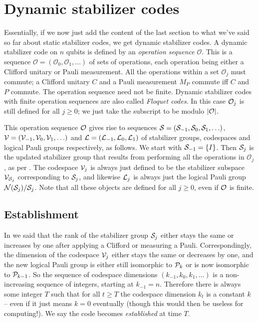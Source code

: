 \section{Dynamic stabilizer codes}\label{sec:dynamic-stabilizer-codes}

Essentially, if we now just add the content of the last section to what we've said so far about static stabilizer codes, we get dynamic stabilizer codes.
A dynamic stabilizer code on $n$ qubits is defined by an \textit{operation sequence} $\mathcal{O}$.
This is a sequence $\mathcal{O} = (\mathcal{O}_0, \mathcal{O}_1, \ldots)$ of sets of operations, each operation being either a Clifford unitary or Pauli measurement.
All the operations within a set $\mathcal{O}_j$ must commute; a Clifford unitary $C$ and a Pauli measurement $M_P$ commute iff $C$ and $P$ commute.
The operation sequence need not be finite.
Dynamic stabilizer codes with finite operation sequences are also called \textit{Floquet codes}.
In this case $\mathcal{O}_j$ is still defined for all $j \geq 0$; we just take the subscript to be modulo $|\mathcal{O}|$.

This operation sequence $\mathcal{O}$ gives rise to sequences $\mathcal{S} = (\mathcal{S}_{-1}, \mathcal{S}_0, \mathcal{S}_1, \ldots)$, $\mathcal{V} = (\mathcal{V}_{-1}, \mathcal{V}_0, \mathcal{V}_1, \ldots)$ and $\mathcal{L} = (\mathcal{L}_{-1}, \mathcal{L}_0, \mathcal{L}_1)$ of stabilizer groups, codespaces and logical Pauli groups respectively, as follows.
We start with $\mathcal{S}_{-1} = \{I\}$.
Then $\mathcal{S}_{j}$ is the updated stabilizer group that results from performing all the operations in $\mathcal{O}_j$, as per .
The codespace $\mathcal{V}_j$ is always just defined to be the stabilizer subspace $\mathcal{V}_{\mathcal{S}_j}$ corresponding to $\mathcal{S}_j$, and likewise $\mathcal{L}_j$ is always just the logical Pauli group $\mathcal{N}(\mathcal{S}_j)/\mathcal{S}_j$.
Note that all these objects are defined for all $j \geq 0$, even if $\mathcal{O}$ is finite.

\subsection{Establishment}

In  we said that the rank of the stabilizer group $\mathcal{S}_j$ either stays the same or increases by one after applying a Clifford or measuring a Pauli.
Correspondingly, the dimension of the codespace $\mathcal{V}_j$ either stays the same or decreases by one, and the new logical Pauli group is either still isomorphic to $\mathcal{P}_k$ or is now isomorphic to $\mathcal{P}_{k-1}$.
So the sequence of codespace dimensions $(k_{-1}, k_0, k_1, \ldots)$ is a non-increasing sequence of integers, starting at $k_{-1} = n$.
Therefore there is always some integer $T$ such that for all $t \geq T$ the codespace dimension $k_t$ is a constant $k$ -- even if it just means $k = 0$ eventually (though this would then be useless for computing!).
We say the code becomes \textit{established} at time $T$.

